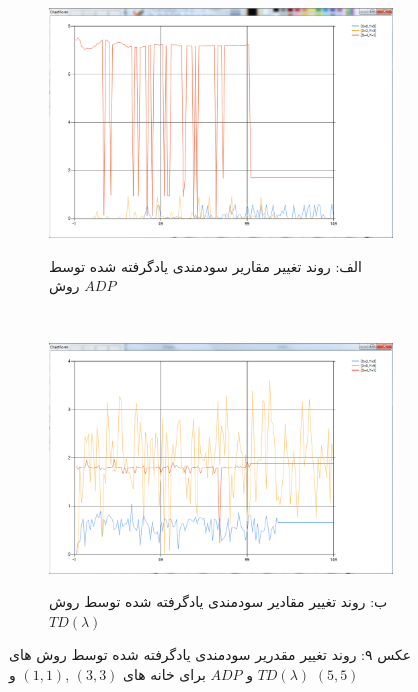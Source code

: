 \documentclass[10pt,a4paper]{article}
\begin{document}
\begin{figure}[h]
        \centering
        \begin{subfigure}[b]{0.5\textwidth}
            \includegraphics[width=\textwidth]{q-adp}
            \begin{center}
                \textarabic{الف: روند تغییر مقاریر سودمندی یادگرفته شده توسط روش $ADP$ }
            \end{center}
        \end{subfigure}%
        ~ %
        \begin{subfigure}[b]{0.5\textwidth}
           \includegraphics[width=\textwidth]{q-td}
            \begin{center}
                \textarabic{ب: روند تغییر مقادیر سودمندی یادگرفته شده توسط روش $TD(\lambda)$ }
            \end{center}
        \end{subfigure}
    \begin{center}
    \textarabic{عکس ۹: روند تغییر مقدریر سودمندی یادگرفته شده توسط روش های
     $TD(\lambda)$ و $ADP$
      برای خانه های 
     $(3,3)$ ,$(1, 1)$ و $(5, 5)$
     }
    \end{center}
\end{figure}
\end{document}
